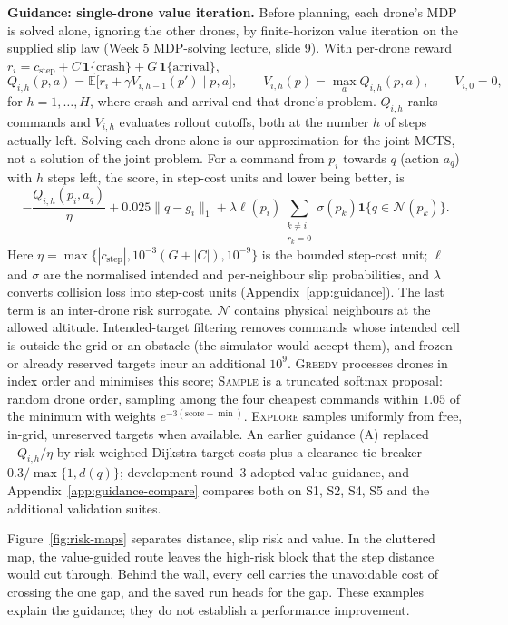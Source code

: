 \textbf{Guidance: single-drone value iteration.} Before planning, each drone's
MDP is solved alone, ignoring the other drones, by finite-horizon value
iteration on the supplied slip law (Week 5 MDP-solving lecture, slide 9).
With per-drone reward
$r_i=c_{\mathrm{step}}+C\,\mathbf1\{\text{crash}\}+G\,\mathbf1\{\text{arrival}\}$,
\[
 Q_{i,h}(p,a)=\mathbb E\bigl[r_i+\gamma V_{i,h-1}(p')\mid p,a\bigr],\qquad
 V_{i,h}(p)=\max_a Q_{i,h}(p,a),\qquad V_{i,0}=0,
\]
for $h=1,\ldots,H$, where crash and arrival end that drone's problem.
$Q_{i,h}$ ranks commands and $V_{i,h}$ evaluates rollout cutoffs, both at
the number $h$ of steps actually left. Solving each drone alone is our
approximation for the joint MCTS, not a solution of the joint problem.
For a command from $p_i$ towards $q$ (action $a_q$) with $h$ steps left, the
score, in step-cost units and lower being better, is
\[
 -\frac{Q_{i,h}(p_i,a_q)}{\eta}+0.025\|q-g_i\|_1
 +\lambda\ell(p_i)\sum_{\substack{k\ne i\\r_k=0}}
 \sigma(p_k)\mathbf1\{q\in\mathcal N(p_k)\}.
\]
Here $\eta=\max\{|c_{\mathrm{step}}|,10^{-3}(G+|C|),10^{-9}\}$ is the
bounded step-cost unit; $\ell$ and $\sigma$ are the normalised intended and per-neighbour slip
probabilities, and $\lambda$ converts collision loss into step-cost units
(Appendix~\ref{app:guidance}). The last term is an inter-drone risk surrogate.
$\mathcal N$ contains physical neighbours at the allowed altitude.
Intended-target filtering removes commands whose intended cell is outside
the grid or an obstacle (the simulator would accept them), and frozen or
already reserved targets incur an additional $10^9$.
\textsc{Greedy} processes drones in index order and minimises this score;
\textsc{Sample} is a truncated softmax proposal: random drone order,
sampling among the four cheapest commands within $1.05$ of the minimum
with weights $e^{-3(\mathrm{score}-\min)}$.
\textsc{Explore} samples uniformly from free, in-grid, unreserved targets
when available. An earlier guidance (A) replaced $-Q_{i,h}/\eta$
by risk-weighted Dijkstra target costs plus a clearance tie-breaker
$0.3/\max\{1,d(q)\}$; development round~3 adopted value
guidance, and Appendix~\ref{app:guidance-compare} compares both on
S1, S2, S4, S5 and the additional validation suites.

Figure~\ref{fig:risk-maps} separates distance, slip risk and value. In the
cluttered map, the value-guided route leaves the high-risk block that the
step distance would cut through. Behind the wall, every cell carries the
unavoidable cost of crossing the one gap, and the saved run heads for the
gap. These examples explain the guidance; they do not establish a
performance improvement.


